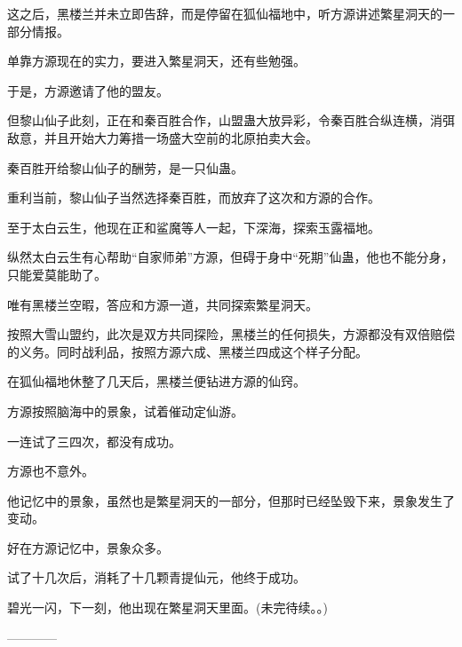 \begin{this_body}
这之后，黑楼兰并未立即告辞，而是停留在狐仙福地中，听方源讲述繁星洞天的一部分情报。

单靠方源现在的实力，要进入繁星洞天，还有些勉强。

于是，方源邀请了他的盟友。

但黎山仙子此刻，正在和秦百胜合作，山盟蛊大放异彩，令秦百胜合纵连横，消弭敌意，并且开始大力筹措一场盛大空前的北原拍卖大会。

秦百胜开给黎山仙子的酬劳，是一只仙蛊。

重利当前，黎山仙子当然选择秦百胜，而放弃了这次和方源的合作。

至于太白云生，他现在正和鲨魔等人一起，下深海，探索玉露福地。

纵然太白云生有心帮助“自家师弟”方源，但碍于身中“死期”仙蛊，他也不能分身，只能爱莫能助了。

唯有黑楼兰空暇，答应和方源一道，共同探索繁星洞天。

按照大雪山盟约，此次是双方共同探险，黑楼兰的任何损失，方源都没有双倍赔偿的义务。同时战利品，按照方源六成、黑楼兰四成这个样子分配。

在狐仙福地休整了几天后，黑楼兰便钻进方源的仙窍。

方源按照脑海中的景象，试着催动定仙游。

一连试了三四次，都没有成功。

方源也不意外。

他记忆中的景象，虽然也是繁星洞天的一部分，但那时已经坠毁下来，景象发生了变动。

好在方源记忆中，景象众多。

试了十几次后，消耗了十几颗青提仙元，他终于成功。

碧光一闪，下一刻，他出现在繁星洞天里面。(未完待续。。)

------------

\end{this_body}

